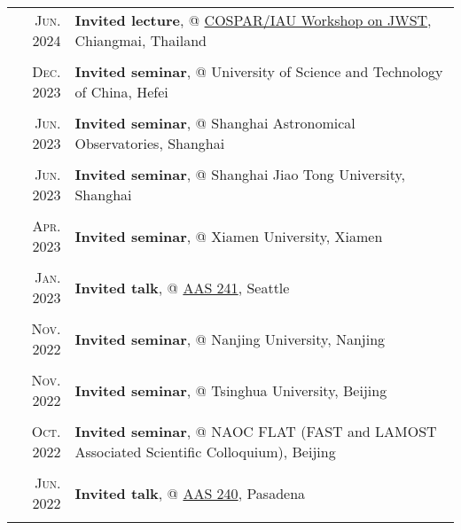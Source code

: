 \documentclass[letterpaper,10pt]{article}
\newcommand{\textwrap}{5.8in}       %
\begin{document}
\begingroup
\renewcommand\arraystretch{0.3}
\vspace*{-.5em}
\begin{longtable}{r|p{\textwrap}}

    \textsc{Jun. 2024}   &   \textbf{Invited lecture}, @ \href{https://cosparhq.cnes.fr/events/cospar-capacity-building-workshops/}{COSPAR/IAU Workshop on JWST}, Chiangmai, Thailand \\
    \multicolumn{2}{c}{} \\

    \textsc{Dec. 2023}   &   \textbf{Invited seminar}, @ University of Science and Technology of China, Hefei \\
    \multicolumn{2}{c}{} \\

    \textsc{Jun. 2023}   &   \textbf{Invited seminar}, @ Shanghai Astronomical Observatories, Shanghai \\
    \multicolumn{2}{c}{} \\

    \textsc{Jun. 2023}   &   \textbf{Invited seminar}, @ Shanghai Jiao Tong University, Shanghai \\
    \multicolumn{2}{c}{} \\

    \textsc{Apr. 2023}   &   \textbf{Invited seminar}, @ Xiamen University, Xiamen \\
    \multicolumn{2}{c}{} \\

    \textsc{Jan. 2023}   &   \textbf{Invited talk}, @ \href{https://aas.org/meetings/aas241}{AAS 241}, Seattle \\
    \multicolumn{2}{c}{} \\

    \textsc{Nov. 2022}   &   \textbf{Invited seminar}, @ Nanjing University, Nanjing    \\
    \multicolumn{2}{c}{} \\

    \textsc{Nov. 2022}   &   \textbf{Invited seminar}, @ Tsinghua University, Beijing   \\
    \multicolumn{2}{c}{} \\

    \textsc{Oct. 2022}   &   \textbf{Invited seminar}, @ NAOC FLAT (FAST and LAMOST Associated Scientific Colloquium), Beijing \\
    \multicolumn{2}{c}{} \\

    \textsc{Jun. 2022}   &   \textbf{Invited talk}, @ \href{https://aas.org/meetings/aas240}{AAS 240}, Pasadena \\
    \multicolumn{2}{c}{} \\


\end{longtable}
\end{document}
